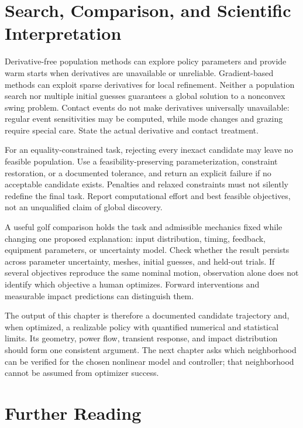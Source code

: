 \section{Search, Comparison, and Scientific Interpretation}

Derivative-free population methods can explore policy parameters and provide
warm starts when derivatives are unavailable or unreliable. Gradient-based
methods can exploit sparse derivatives for local refinement. Neither a
population search nor multiple initial guesses guarantees a global solution
to a nonconvex swing problem. Contact events do not make derivatives
universally unavailable: regular event sensitivities may be computed, while
mode changes and grazing require special care. State the actual derivative
and contact treatment.

For an equality-constrained task, rejecting every inexact candidate may leave
no feasible population. Use a feasibility-preserving parameterization,
constraint restoration, or a documented tolerance, and return an explicit
failure if no acceptable candidate exists. Penalties and relaxed constraints
must not silently redefine the final task. Report computational effort and
best feasible objectives, not an unqualified claim of global discovery.

A useful golf comparison holds the task and admissible mechanics fixed while
changing one proposed explanation: input distribution, timing, feedback,
equipment parameters, or uncertainty model. Check whether the result
persists across parameter uncertainty, meshes, initial guesses, and held-out
trials. If several objectives reproduce the same nominal motion, observation
alone does not identify which objective a human optimizes. Forward
interventions and measurable impact predictions can distinguish them.

The output of this chapter is therefore a documented candidate trajectory
and, when optimized, a realizable policy with quantified numerical and
statistical limits. Its geometry, power flow, transient response, and impact
distribution should form one consistent argument. The next chapter asks
which neighborhood can be verified for the chosen nonlinear model and
controller; that neighborhood cannot be assumed from optimizer success.

\section{Further Reading}

